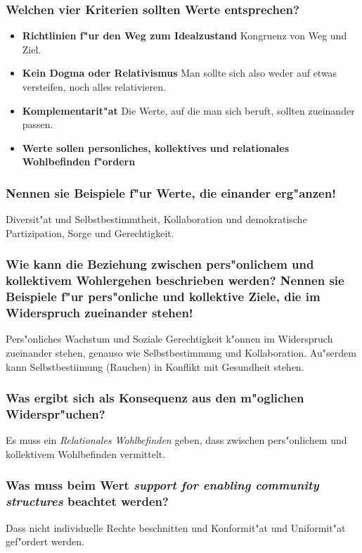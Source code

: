 \subsubsection{Welchen vier Kriterien sollten Werte entsprechen?}
\begin{itemize}
        \item \textbf{Richtlinien f"ur den Weg zum Idealzustand} Kongruenz von Weg und Ziel.
        \item \textbf{Kein Dogma oder Relativismus} Man sollte sich also weder auf etwas versteifen, noch alles relativieren.
        \item \textbf{Komplementarit"at} Die Werte, auf die man sich beruft, sollten zueinander passen.
        \item \textbf{Werte sollen personliches, kollektives und relationales Wohlbefinden f"ordern}
\end{itemize}

\subsubsection{Nennen sie Beispiele f"ur Werte, die einander erg"anzen!}
Diversit"at und Selbstbestimmtheit, Kollaboration und demokratische Partizipation, Sorge und Gerechtigkeit.

\subsubsection{Wie kann die Beziehung zwischen pers"onlichem und kollektivem Wohlergehen beschrieben werden? Nennen sie Beispiele f"ur pers"onliche und kollektive Ziele, die im Widerspruch zueinander stehen!}
Pers"onliches Wachstum und Soziale Gerechtigkeit k"onnen im Widerspruch zueinander stehen, genauso wie Selbstbestimmung und Kollaboration. Au"serdem kann Selbstbestiimung (Rauchen) in Konflikt mit Gesundheit stehen.

\subsubsection{Was ergibt sich als Konsequenz aus den m"oglichen Widerspr"uchen?}
Es muss ein \emph{Relationales Wohlbefinden} geben, dass zwischen pers"onlichem und kollektivem Wohlbefinden vermittelt.

\subsubsection{Was muss beim Wert \emph{support for enabling community structures} beachtet werden?}
Dass nicht individuelle Rechte beschnitten und Konformit"at und Uniformit"at gef"ordert werden.


